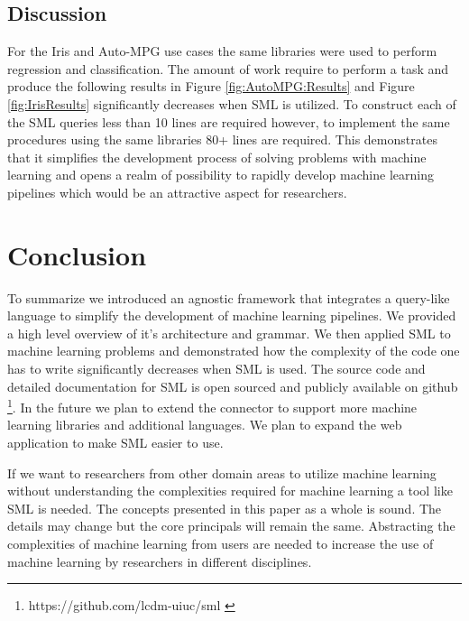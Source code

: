 \documentclass[jair,twoside,11pt,theapa]{article}
\begin{document}
\subsection{Discussion}
For the Iris and Auto-MPG use cases the same libraries were used to perform regression and classification. The amount of work require to perform a task and produce the following results in Figure \ref{fig:AutoMPG:Results} and Figure \ref{fig:IrisResults} significantly decreases when SML is utilized. To construct each of the SML queries less than 10 lines are required however, to implement the same procedures using the same libraries 80+ lines are required. This demonstrates that it simplifies the development process of solving problems with machine learning and opens a realm of possibility to rapidly develop machine learning pipelines which would be an attractive aspect for researchers.

\section{Conclusion}
\label{conclusion}
To summarize we introduced an agnostic framework that integrates a query-like language to simplify the development of machine learning pipelines. We provided a high level overview of it's architecture and grammar. We then applied SML to machine learning problems and demonstrated how the complexity of the code one has to write significantly decreases when SML is used. The source code and detailed documentation for SML is open sourced and publicly available on github \footnote{https://github.com/lcdm-uiuc/sml \label{SML:Github}}. In the future we plan to extend the connector to support more machine learning libraries and additional languages. We plan to expand the web application to make SML easier to use.

If we want to researchers from other domain areas to utilize machine learning without understanding the complexities required for machine learning a tool like SML is needed. The concepts presented in this paper as a whole is sound. The details may change but the core principals will remain the same. Abstracting the complexities of machine learning from users are needed to increase the use of machine learning by researchers in different disciplines.



\vskip 0.2in


\end{document}

